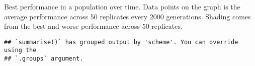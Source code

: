 \documentclass[]{book}
\newenvironment{Shaded}{\begin{snugshade}}{\end{snugshade}}
\newcommand{\DataTypeTok}[1]{\textcolor[rgb]{0.13,0.29,0.53}{#1}}
\newcommand{\KeywordTok}[1]{\textcolor[rgb]{0.13,0.29,0.53}{\textbf{#1}}}
\newcommand{\NormalTok}[1]{#1}
\newcommand{\OperatorTok}[1]{\textcolor[rgb]{0.81,0.36,0.00}{\textbf{#1}}}
\newcommand{\StringTok}[1]{\textcolor[rgb]{0.31,0.60,0.02}{#1}}
\begin{document}
Best performance in a population over time.
Data points on the graph is the average performance across 50 replicates every 2000 generations.
Shading comes from the best and worse performance across 50 replicates.

\begin{Shaded}
\end{Shaded}

\begin{verbatim}
## `summarise()` has grouped output by 'scheme'. You can override using the
## `.groups` argument.
\end{verbatim}
\end{document}
